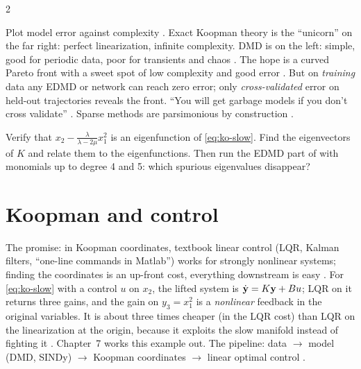 \begin{paracol}{2}
\begin{intuition}
Plot model error against complexity . Exact Koopman theory is the ``unicorn''
on the far right: perfect linearization, infinite complexity. DMD is on the left: simple, good for periodic
data, poor for transients and chaos . The hope is a curved Pareto front with a
sweet spot of low complexity and good error . But on \emph{training} data any
EDMD or network can reach zero error; only \emph{cross-validated} error on held-out trajectories reveals the
front. ``You will get garbage models if you don't cross validate'' .
Sparse methods are parsimonious by construction .
\end{intuition}

\begin{exercise}
Verify that $x_2-\frac{\lambda}{\lambda-2\mu}x_1^2$ is an eigenfunction of \eqref{eq:ko-slow}. Find the eigenvectors
of $K$ and relate them to the eigenfunctions. Then run the EDMD part of  with monomials up
to degree 4 and 5: which spurious eigenvalues disappear?
\end{exercise}

\section{Koopman and control}\label{sec:ko-control}

The promise: in Koopman coordinates, textbook linear control (LQR, Kalman filters, ``one-line commands in
Matlab'') works for strongly nonlinear systems; finding the coordinates is an up-front cost, everything
downstream is easy . For \eqref{eq:ko-slow} with a control $u$ on $x_2$, the lifted
system is $\dot{\mathbf{y}}=K\mathbf{y}+Bu$; LQR on it returns three gains, and the gain on $y_3=x_1^2$ is a
\emph{nonlinear} feedback in the original variables. It is about three times cheaper (in the LQR cost) than
LQR on the linearization at the origin, because it exploits the slow manifold instead of fighting it
. Chapter~7 works this example
out. The pipeline: data $\to$ model (DMD, SINDy) $\to$ Koopman coordinates $\to$ linear optimal control
.


\end{paracol}
